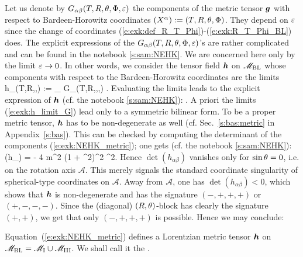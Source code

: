 Let us denote by $G_{\alpha\beta}(T,R,\theta,\Phi,\varepsilon)$ the components of
the metric tensor $\bm{g}$ with respect to Bardeen-Horowitz
coordinates $(X^\alpha):=(T,R,\theta,\Phi)$. They depend on $\varepsilon$
since the change of coordinates (\ref{e:exk:def_R_T_Phi})-(\ref{e:exk:R_T_Phi_BL})
does. The explicit expressions of the  $G_{\alpha\beta}(T,R,\theta,\Phi,\varepsilon)$'s are
rather complicated and can be found in
the notebook \ref{s:sam:NEHK}.
We are concerned here only by the limit $\varepsilon\to 0$. In other words, we
consider the tensor field $\bm{h}$ on $\mathscr{M}_{\rm BL}$ whose components with respect to the
Bardeen-Horowitz coordinates are the limits
\be \label{e:exk:h_limit_G}
    h_{\alpha\beta}(T,R,\th,\Phi) := \lim_{\veps{}} G_{\alpha\beta}(T,R,\th,\Phi,\veps) .
\ee
Evaluating the limits leads to the explicit expression
of $\bm{h}$ (cf. the notebook \ref{s:sam:NEHK}):
\be \label{e:exk:NEHK_metric}
     .
\ee
A priori the limits (\ref{e:exk:h_limit_G}) lead only to a symmetric bilinear
form. To be a proper metric tensor, $\bm{h}$ has to be non-degenerate as well
(cf. Sec.~\ref{s:bas:metric} in Appendix~\ref{s:bas}). This can be checked by computing the
determinant of the components (\ref{e:exk:NEHK_metric}); one gets
(cf. the notebook \ref{s:sam:NEHK}):
\be
    \det (h_{\alpha\beta}) = - 4 m^2 (1 + \cos^2\th)^2 \sin^2\th .
\ee
Hence $\det (h_{\alpha\beta})$ vanishes only for $\sin\theta = 0$, i.e.
on the rotation axis $\mathscr{A}$. This merely signals the standard coordinate singularity of spherical-type coordinates on $\mathscr{A}$. Away from $\mathscr{A}$, one has $\det (h_{\alpha\beta}) < 0$, which
shows that $\bm{h}$ is non-degenerate and has the signature $(-,+,+,+)$ or $(+,-,-,-)$.
Since the (diagonal) $(R,\theta)$-block has clearly the signature $(+,+)$, we get
that only $(-,+,+,+)$ is possible. Hence we may conclude:
\begin{prop}
Equation~(\ref{e:exk:NEHK_metric}) defines a Lorentzian metric tensor $\bm{h}$
on $\mathscr{M}_{\rm BL} = \mathscr{M}_{\rm I} \cup \mathscr{M}_{\rm III}$.
We shall call it the  .
\end{prop}

